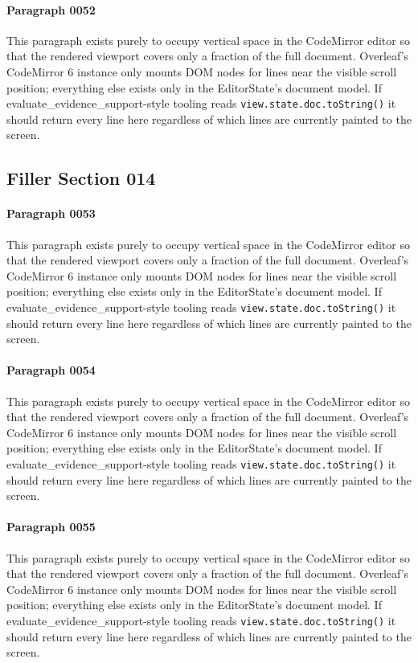 \documentclass{article}
\begin{document}
\paragraph{Paragraph 0052}
This paragraph exists purely to occupy vertical space in the CodeMirror editor so that the rendered viewport covers only a fraction of the full document. Overleaf's CodeMirror 6 instance only mounts DOM nodes for lines near the visible scroll position; everything else exists only in the EditorState's document model. If evaluate\_evidence\_support-style tooling reads \texttt{view.state.doc.toString()} it should return every line here regardless of which lines are currently painted to the screen.

\subsection{Filler Section 014}
\paragraph{Paragraph 0053}
This paragraph exists purely to occupy vertical space in the CodeMirror editor so that the rendered viewport covers only a fraction of the full document. Overleaf's CodeMirror 6 instance only mounts DOM nodes for lines near the visible scroll position; everything else exists only in the EditorState's document model. If evaluate\_evidence\_support-style tooling reads \texttt{view.state.doc.toString()} it should return every line here regardless of which lines are currently painted to the screen.

\paragraph{Paragraph 0054}
This paragraph exists purely to occupy vertical space in the CodeMirror editor so that the rendered viewport covers only a fraction of the full document. Overleaf's CodeMirror 6 instance only mounts DOM nodes for lines near the visible scroll position; everything else exists only in the EditorState's document model. If evaluate\_evidence\_support-style tooling reads \texttt{view.state.doc.toString()} it should return every line here regardless of which lines are currently painted to the screen.

\paragraph{Paragraph 0055}
This paragraph exists purely to occupy vertical space in the CodeMirror editor so that the rendered viewport covers only a fraction of the full document. Overleaf's CodeMirror 6 instance only mounts DOM nodes for lines near the visible scroll position; everything else exists only in the EditorState's document model. If evaluate\_evidence\_support-style tooling reads \texttt{view.state.doc.toString()} it should return every line here regardless of which lines are currently painted to the screen.
\end{document}
